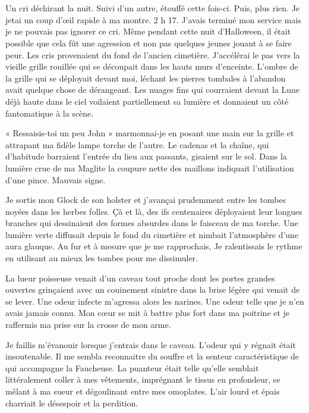 \chapter{}
Un cri déchirant la nuit. Suivi d'un autre, étouffé cette fois-ci. Puis, plus rien. Je jetai un coup d'œil rapide à ma 
montre. 2 h 17. J'avais terminé mon service mais je ne pouvais pas ignorer ce cri. Même pendant cette nuit d'Halloween, 
il était possible que cela fût une agression et non pas quelques jeunes jouant à se faire peur. Les cris provenaient du 
fond de l'ancien cimetière. J'accélérai le pas vers la vieille grille rouillée qui se découpait dans les hauts murs 
d'enceinte. L'ombre de la grille qui se déployait devant moi, léchant les pierres tombales à l'abandon avait quelque 
chose de dérangeant. Les nuages fins qui courraient devant la Lune déjà haute dans le ciel voilaient partiellement sa 
lumière et donnaient un côté fantomatique à la scène.

« Ressaisis-toi un peu John » marmonnai-je en posant une main sur la grille et attrapant ma fidèle lampe torche de 
l'autre. Le cadenas et la chaîne, qui d'habitude barraient l'entrée du lieu aux passants, gisaient sur le sol. Dans la 
lumière crue de ma Maglite la coupure nette des maillons indiquait l'utilisation d'une pince. Mauvais signe.

Je sortis mon Glock de son holster et j'avançai prudemment entre les tombes noyées dans les herbes folles. Çà et là, 
des ifs centenaires déployaient leur longues branches qui dessinaient des formes absurdes dans le faisceau de ma 
torche. Une lumière verte diffusait depuis le fond du cimetière et nimbait l'atmosphère d'une aura glauque. Au fur et à 
mesure que je me rapprochais, Je ralentissais le rythme en utilisant au mieux les tombes pour me dissimuler.

La lueur poisseuse venait d'un caveau tout proche dont les portes grandes ouvertes grinçaient avec un couinement 
sinistre dans la brise légère qui venait de se lever. Une odeur infecte m'agressa alors les narines. Une odeur telle 
que je n'en avais jamais connu. Mon cœur se mit à battre plus fort dans ma poitrine et je raffermis ma prise sur la 
crosse de mon arme.

Je faillis m'évanouir lorsque j'entrais dans le caveau. L'odeur qui y régnait était insoutenable. Il me sembla 
reconnaitre du souffre et la senteur caractéristique de qui accompagne la Faucheuse. La puanteur était telle qu'elle 
semblait littéralement coller à mes vêtements, imprégnant le tissus en profondeur, se mêlant à ma sueur et dégoulinant 
entre mes omoplates. L'air lourd et épais charriait le désespoir et la perdition.


